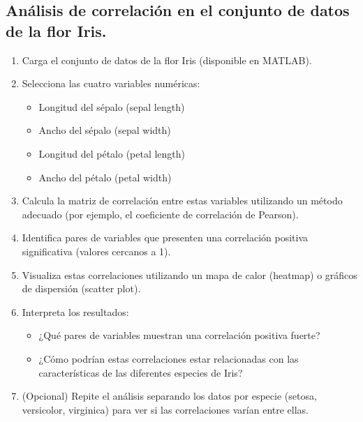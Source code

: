 \subsection{Análisis de correlación en el conjunto de datos de la flor Iris.}

\begin{enumerate}
    \item Carga el conjunto de datos de la flor Iris (disponible en MATLAB).
    \item Selecciona las cuatro variables numéricas:
    \begin{itemize}
        \item Longitud del sépalo (sepal length)
        \item Ancho del sépalo (sepal width)
        \item Longitud del pétalo (petal length)
        \item Ancho del pétalo (petal width)
    \end{itemize}
    \item Calcula la matriz de correlación entre estas variables utilizando un método adecuado (por ejemplo, el coeficiente de correlación de Pearson).
    \item Identifica pares de variables que presenten una correlación positiva significativa (valores cercanos a 1).
    \item Visualiza estas correlaciones utilizando un mapa de calor (heatmap) o gráficos de dispersión (scatter plot).
    \item Interpreta los resultados:
    \begin{itemize}
        \item ¿Qué pares de variables muestran una correlación positiva fuerte?
        \item ¿Cómo podrían estas correlaciones estar relacionadas con las características de las diferentes especies de Iris?
    \end{itemize}
    \item (Opcional) Repite el análisis separando los datos por especie (setosa, versicolor, virginica) para ver si las correlaciones varían entre ellas.
\end{enumerate}
